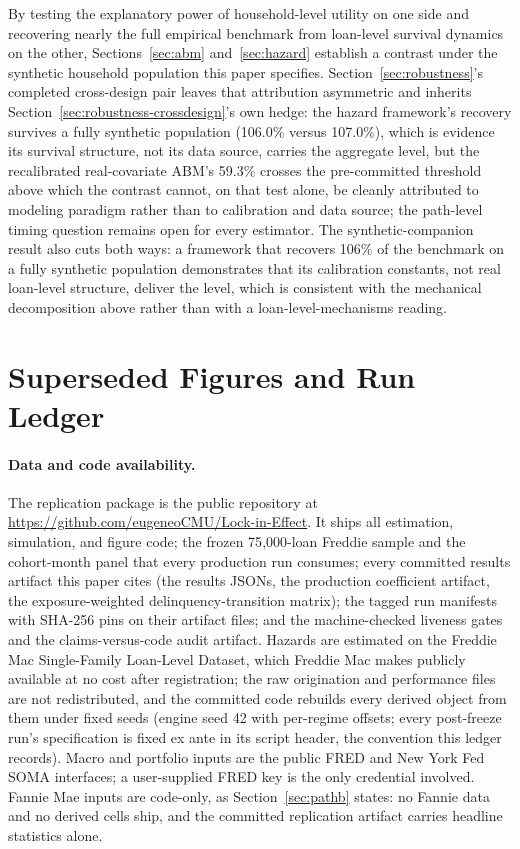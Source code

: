 \documentclass[12pt]{article}
\begin{document}
By testing the explanatory power of household-level utility on one side and recovering nearly the full empirical benchmark from loan-level survival dynamics on the other, Sections~\ref{sec:abm} and~\ref{sec:hazard} establish a contrast under the synthetic household population this paper specifies. Section~\ref{sec:robustness}'s completed cross-design pair leaves that attribution asymmetric and inherits Section~\ref{sec:robustness-crossdesign}'s own hedge: the hazard framework's recovery survives a fully synthetic population (106.0\% versus 107.0\%), which is evidence its survival structure, not its data source, carries the aggregate level, but the recalibrated real-covariate ABM's 59.3\% crosses the pre-committed threshold above which the contrast cannot, on that test alone, be cleanly attributed to modeling paradigm rather than to calibration and data source; the path-level timing question remains open for every estimator. The synthetic-companion result also cuts both ways: a framework that recovers 106\% of the benchmark on a fully synthetic population demonstrates that its calibration constants, not real loan-level structure, deliver the level, which is consistent with the mechanical decomposition above rather than with a loan-level-mechanisms reading.

\newpage
\appendix

\section{Superseded Figures and Run Ledger}\label{app:ledger}

\paragraph{Data and code availability.} The replication package is the public repository at \url{https://github.com/eugeneoCMU/Lock-in-Effect}. It ships all estimation, simulation, and figure code; the frozen 75{,}000-loan Freddie sample and the cohort-month panel that every production run consumes; every committed results artifact this paper cites (the results JSONs, the production coefficient artifact, the exposure-weighted delinquency-transition matrix); the tagged run manifests with SHA-256 pins on their artifact files; and the machine-checked liveness gates and the claims-versus-code audit artifact. Hazards are estimated on the Freddie Mac Single-Family Loan-Level Dataset, which Freddie Mac makes publicly available at no cost after registration; the raw origination and performance files are not redistributed, and the committed code rebuilds every derived object from them under fixed seeds (engine seed 42 with per-regime offsets; every post-freeze run's specification is fixed ex ante in its script header, the convention this ledger records). Macro and portfolio inputs are the public FRED and New York Fed SOMA interfaces; a user-supplied FRED key is the only credential involved. Fannie Mae inputs are code-only, as Section~\ref{sec:pathb} states: no Fannie data and no derived cells ship, and the committed replication artifact carries headline statistics alone.
\end{document}
